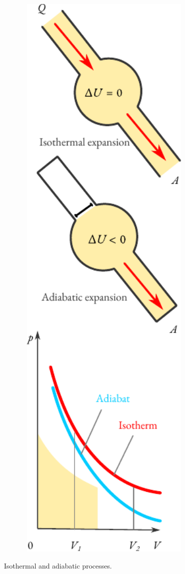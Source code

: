 \begin{marginfigure}[-3.5cm]%
\centering
\includegraphics[width=0.8\textwidth]{figures/isotherm-adia.pdf}
\caption{Isothermal and adiabatic processes.\label{iso-adia}}
\end{marginfigure}



